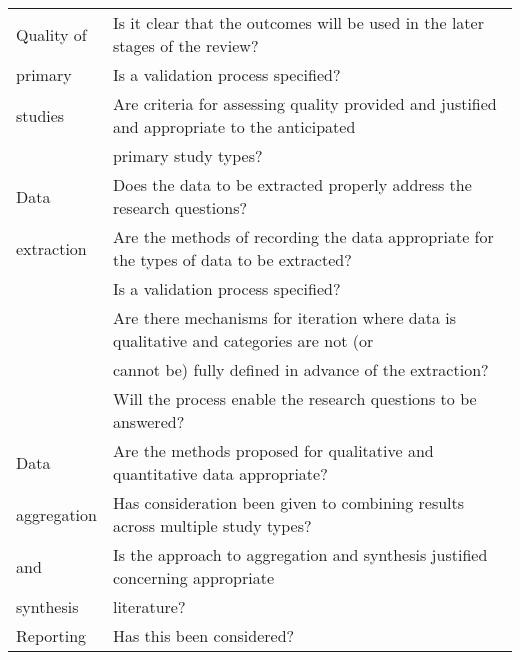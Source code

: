 \begin{table}
\begin{center}
{\begin{tabular}{|l||l|}
                    \hline
                    Quality of  & Is it clear that the outcomes will be used in the later stages of the review?              \\
                    primary     & Is a validation process specified?                                                         \\
                    studies     & Are criteria for assessing quality provided and justified and appropriate to the anticipated\\ 
                                & primary study types?                                                                       \\
                    \hline
                    Data        & Does the data to be extracted properly address the research questions?                     \\
                    extraction  & Are the methods of recording the data appropriate for the types of data to be extracted?   \\
                                & Is a validation process specified?                                                         \\
                                & Are there mechanisms for iteration where data is qualitative and categories are not (or    \\
                                & cannot be) fully defined in advance of the extraction?                                     \\
                                & Will the process enable the research questions to be answered?                             \\
                    \hline
                    Data        & Are the methods proposed for qualitative and quantitative data appropriate?                \\
                    aggregation & Has consideration been given to combining results across multiple study types?             \\
                    and         & Is the approach to aggregation and synthesis justified concerning appropriate              \\
                    synthesis   & literature?                                                                                \\
                    \hline
                    Reporting   & Has this been considered?                                                                  \\

\end{tabular}}
\end{center}
\end{table}
